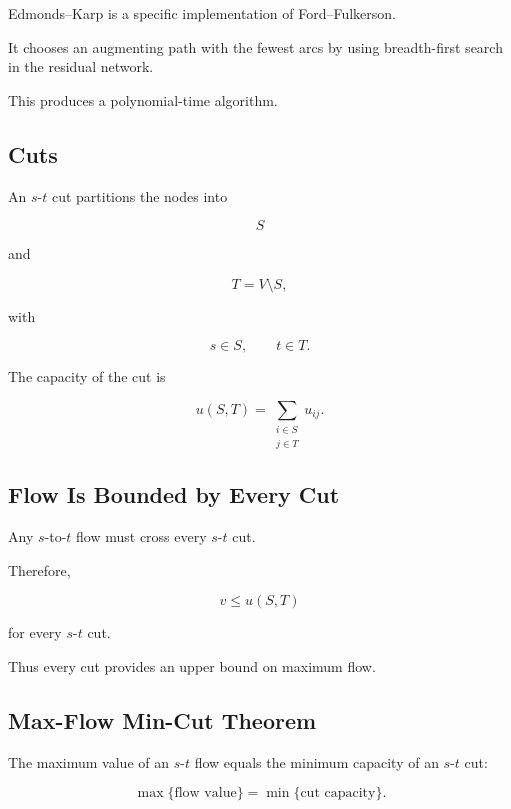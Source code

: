 Edmonds--Karp is a specific implementation of Ford--Fulkerson.

It chooses an augmenting path with the fewest arcs by using breadth-first
search in the residual network.

This produces a polynomial-time algorithm.

\subsection{Cuts}
\label{subsec:network-cuts}

An \(s\)-\(t\) cut partitions the nodes into

\[
S
\]

and

\[
T=V\setminus S,
\]

with

\[
s\in S,
\qquad
t\in T.
\]

The capacity of the cut is

\[
\boxed{
u(S,T)
=
\sum_{\substack{i\in S\\j\in T}}
u_{ij}.
}
\]

\subsection{Flow Is Bounded by Every Cut}
\label{subsec:flow-cut-bound}

Any \(s\)-to-\(t\) flow must cross every \(s\)-\(t\) cut.

Therefore,

\[
\boxed{
v
\leq
u(S,T)
}
\]

for every \(s\)-\(t\) cut.

Thus every cut provides an upper bound on maximum flow.

\subsection{Max-Flow Min-Cut Theorem}
\label{subsec:max-flow-min-cut}

\begin{theorem}
The maximum value of an \(s\)-\(t\) flow equals the minimum capacity of an
\(s\)-\(t\) cut:

\[
\boxed{
\max
\{
\text{flow value}
\}
=
\min
\{
\text{cut capacity}
\}.
}
\]
\end{theorem}

